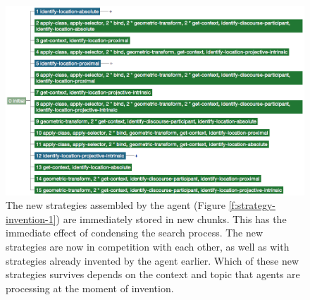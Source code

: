 \begin{figure}
\begin{center}
\includegraphics[width=1.0\columnwidth]{figs/conceptualization-strategy-invention-2.png}
\end{center}
\caption[Effect of new conceptualization strategies on the search process]{%
The new strategies assembled by the agent (Figure \ref{f:strategy-invention-1})
are immediately stored in new chunks. This has the immediate effect of 
condensing the search process.
The new strategies are now in competition with each other, as well as with strategies 
already invented by the agent earlier. Which of these new strategies survives 
depends on the context and topic that agents are processing at the moment of invention.}
\label{f:strategy-invention-2}
\end{figure}

